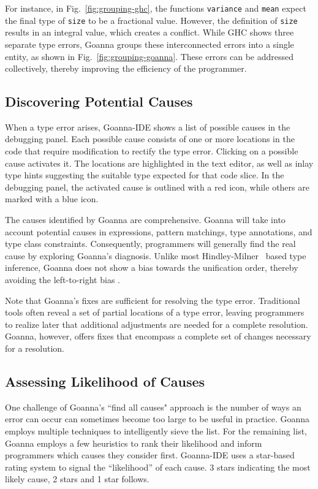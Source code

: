     For instance, in Fig.~\ref{fig:grouping-ghc}, the functions \texttt{variance} and \texttt{mean} expect the final type of \texttt{size} to be a fractional value. However, the definition of \texttt{size} results in an integral value, which creates a conflict. While GHC shows three separate type errors, Goanna groups these interconnected errors into a single entity, as shown in Fig.~\ref{fig:grouping-goanna}. These errors can be addressed collectively, thereby improving the efficiency of the programmer.

    \subsection{Discovering Potential Causes} \label{sub:suggesting}
    When a type error arises, Goanna-IDE shows a list of possible causes in the debugging panel. Each possible cause consists of one or more locations in the code that require modification to rectify the type error. Clicking on a possible cause activates it. The locations are highlighted in the text editor, as well as inlay type hints suggesting the suitable type expected for that code slice. In the debugging panel, the activated cause is outlined with a red icon, while others are marked with a blue icon. 

    The causes identified by Goanna are comprehensive. Goanna will take into account potential causes in expressions, pattern matchings, type annotations, and type class constraints. Consequently, programmers will generally find the real cause by exploring Goanna's diagnosis. Unlike most Hindley-Milner~\cite{Damas1982-zw} based type inference, Goanna does not show a bias towards the unification order, thereby avoiding the left-to-right bias \cite{Chen2014-ev}. 
    
    Note that Goanna's fixes are sufficient for resolving the type error. Traditional tools often reveal a set of partial locations of a type error, leaving programmers to realize later that additional adjustments are needed for a complete resolution. Goanna, however, offers fixes that encompass a complete set of changes necessary for a resolution.


    \subsection{Assessing Likelihood of Causes} \label{sub:conciseness}
    One challenge of Goanna's ``find all causes" approach is the number of ways an error can occur can sometimes become too large to be useful in practice. Goanna employs multiple techniques to intelligently sieve the list. For the remaining list, Goanna employs a few heuristics to rank their likelihood and inform programmers which causes they consider first. 
    Goanna-IDE uses a star-based rating system to signal the ``likelihood'' of each cause. 3 stars indicating the most likely cause, 2 stars and 1 star follows. 


